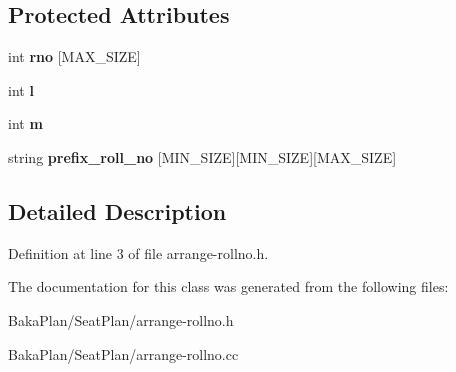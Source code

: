 \subsection*{Protected Attributes}
\begin{DoxyCompactItemize}
\item 
\hypertarget{classArrangeRollNo_acf5d0a49632ff54fcf9281ccfd9c8cd9}{int {\bfseries rno} \mbox{[}M\-A\-X\-\_\-\-S\-I\-Z\-E\mbox{]}}\label{classArrangeRollNo_acf5d0a49632ff54fcf9281ccfd9c8cd9}

\item 
\hypertarget{classArrangeRollNo_a1a1aee004c6072358474336b20fdae27}{int {\bfseries l}}\label{classArrangeRollNo_a1a1aee004c6072358474336b20fdae27}

\item 
\hypertarget{classArrangeRollNo_a626e7c9475affbe5b55d1aa4f69269c7}{int {\bfseries m}}\label{classArrangeRollNo_a626e7c9475affbe5b55d1aa4f69269c7}

\item 
\hypertarget{classArrangeRollNo_a45badfe828041d92fc5d7ad0a5b7ac07}{string {\bfseries prefix\-\_\-roll\-\_\-no} \mbox{[}M\-I\-N\-\_\-\-S\-I\-Z\-E\mbox{]}\mbox{[}M\-I\-N\-\_\-\-S\-I\-Z\-E\mbox{]}\mbox{[}M\-A\-X\-\_\-\-S\-I\-Z\-E\mbox{]}}\label{classArrangeRollNo_a45badfe828041d92fc5d7ad0a5b7ac07}

\end{DoxyCompactItemize}


\subsection{Detailed Description}


Definition at line 3 of file arrange-\/rollno.\-h.



The documentation for this class was generated from the following files\-:\begin{DoxyCompactItemize}
\item 
Baka\-Plan/\-Seat\-Plan/arrange-\/rollno.\-h\item 
Baka\-Plan/\-Seat\-Plan/arrange-\/rollno.\-cc\end{DoxyCompactItemize}

